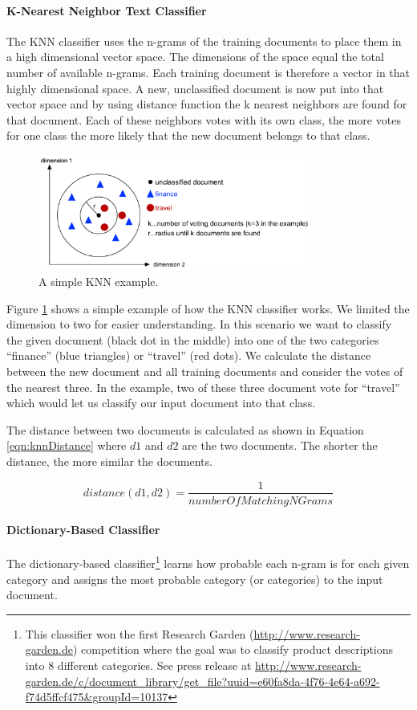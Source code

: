\paragraph{K-Nearest Neighbor Text Classifier}
The KNN classifier uses the n-grams of the training documents to place them in a high dimensional vector space. The dimensions of the space equal the total number of available n-grams. Each training document is therefore a vector in that highly dimensional space. A new, unclassified document is now put into that vector space and by using distance function the k nearest neighbors are found for that document. Each of these neighbors votes with its own class, the more votes for one class the more likely that the new document belongs to that class.

\begin{figure}[ht!]
\centering
\includegraphics[width=0.8\textwidth]{img/knn.pdf}
\caption{A simple KNN example.}
\label{fig:knn}
\end{figure}

Figure \ref{fig:knn} shows a simple example of how the KNN classifier works. We limited the dimension to two for easier understanding. In this scenario we want to classify the given document (black dot in the middle) into one of the two categories ``finance'' (blue triangles) or ``travel'' (red dots). We calculate the distance between the new document and all training documents and consider the votes of the nearest three. In the example, two of these three document vote for ``travel'' which would let us classify our input document into that class.

The distance between two documents is calculated as shown in Equation \ref{eqn:knnDistance} where $d1$ and $d2$ are the two documents. The shorter the distance, the more similar the documents.

\begin{equation}
\label{eqn:knnDistance}
distance(d1,d2) = \frac{1}{numberOfMatchingNGrams}
\end{equation}

\paragraph{Dictionary-Based Classifier}
The dictionary-based classifier\footnote{This classifier won the first Research Garden (\url{http://www.research-garden.de}) competition where the goal was to classify product descriptions into 8 different categories. See press release at \url{http://www.research-garden.de/c/document_library/get_file?uuid=e60fa8da-4f76-4e64-a692-f74d5ffcf475&groupId=10137}} learns how probable each n-gram is for each given category and assigns the most probable category (or categories) to the input document.

